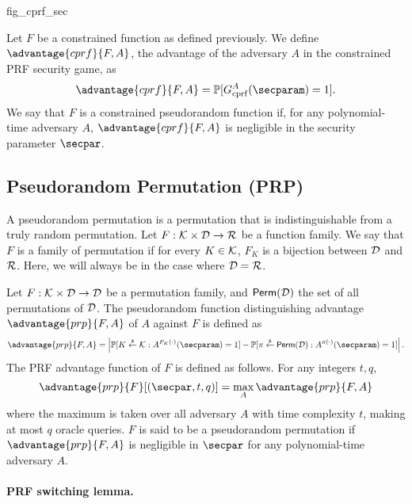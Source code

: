 {fig_cprf_sec}

\begin{definition}
	Let $F$ be a constrained function as defined previously.
	We define $\advantage{cprf}{F,A}$, the advantage of the adversary $A$ in the constrained PRF security game, as
	\[
		\advantage{cprf}{F,A} = \Prob[G_{\subgamestyle{cprf}}^A(\secparam) = 1].
	\]
	We say that $F$ is a constrained pseudorandom function if, for any polynomial-time adversary $A$, $\advantage{cprf}{F,A}$ is negligible in the security parameter $\secpar$.
\end{definition}



\subsection{Pseudorandom Permutation (PRP)} %
\label{sub:def_prp}

A pseudorandom permutation is a permutation that is indistinguishable from a truly random permutation.
Let $F: \mathcal{K} \times \mathcal{D} \rightarrow \mathcal{R}$ be a function family.
We say that $F$ is a family of permutation if for every $K \in \mathcal{K}$, $F_K$ is a bijection between $\mathcal{D}$ and $\mathcal{R}$.
Here, we will always be in the case where $\mathcal{D} = \mathcal{R}$.

\begin{definition}
	\label{def:prp}
	Let $F: \mathcal{K} \times \mathcal{D} \rightarrow \mathcal{D}$ be a permutation family, and $\mathsf{Perm}(\mathcal{D})$ the set of all permutations of $\mathcal{D}$.
	The pseudorandom function distinguishing advantage $\advantage{prp}{F, A}$ of $A$ against $F$ is defined as
	\[
		\advantage{prp}{F, A} = \left| \Prob[K \getsr \cK : A^{F_K(\cdot)}(\secparam) = 1] 
												- \Prob[\pi \getsr \mathsf{Perm}(\cD) : A^{\pi(\cdot)}(\secparam) = 1] \right|.
	\]
	The PRF advantage function of $F$ is defined as follows. For any integers $t,q$,
	\[
		\advantage{prp}{F}[(\secpar, t, q)] = \max_{A} \advantage{prp}{F, A}
	\]
	where the maximum is taken over all adversary $A$ with time complexity $t$, making at most $q$ oracle queries.
	$F$ is said to be a pseudorandom permutation if $\advantage{prp}{F, A}$ is negligible in $\secpar$ for any polynomial-time adversary $A$.
\end{definition}

\paragraph{PRF switching lemma.} %
\label{par:prf_switching_lemma}

